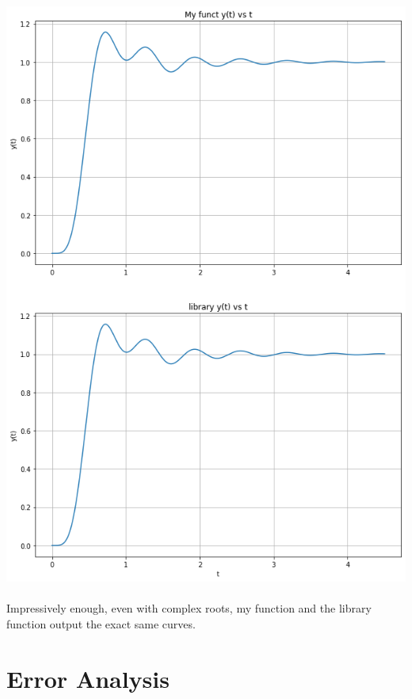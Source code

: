 \documentclass[12pt]{report}
\begin{document}
    \includegraphics[scale=0.6]{complicated compare.png}
    
    \paragraph{} Impressively enough, even with complex roots, my function and the library function output the exact same curves. 


\section{Error Analysis}

\end{document}
